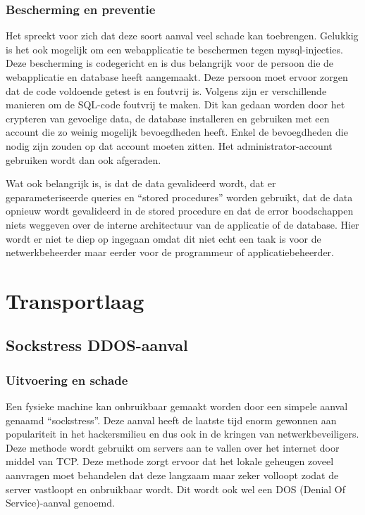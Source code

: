 \documentclass[pdftex,a4paper,12pt]{report}
\begin{document}
\subsubsection{Bescherming en preventie}
Het spreekt voor zich dat deze soort aanval veel schade kan toebrengen. Gelukkig is het ook mogelijk om een webapplicatie te beschermen tegen mysql-injecties. Deze bescherming is codegericht en is dus belangrijk voor de persoon die de webapplicatie en database heeft aangemaakt. Deze persoon moet ervoor zorgen dat de code voldoende getest is en foutvrij is. Volgens \cite{Angus2005} zijn er verschillende manieren om de SQL-code foutvrij te maken. Dit kan gedaan worden door het crypteren van gevoelige data, de database installeren en gebruiken met een account die zo weinig mogelijk bevoegdheden heeft. Enkel de bevoegdheden die nodig zijn zouden op dat account moeten zitten. Het administrator-account gebruiken wordt dan ook afgeraden. \newline

Wat ook belangrijk is, is dat de data gevalideerd wordt, dat er geparameteriseerde queries en "`stored procedures"' worden gebruikt, dat de data opnieuw wordt gevalideerd in de stored procedure en dat de error boodschappen niets weggeven over de interne architectuur van de applicatie of de database. Hier wordt er niet te diep op ingegaan omdat dit niet echt een taak is voor de netwerkbeheerder maar eerder voor de programmeur of applicatiebeheerder. 

\section{Transportlaag}
\subsection{Sockstress DDOS-aanval}
\subsubsection{Uitvoering en schade}
Een fysieke machine kan onbruikbaar gemaakt worden door een simpele aanval genaamd "`sockstress"'. Deze aanval heeft de laatste tijd enorm gewonnen aan populariteit in het hackersmilieu en dus ook in de kringen van netwerkbeveiligers. Deze methode wordt gebruikt om servers aan te vallen over het internet door middel van TCP. Deze methode zorgt ervoor dat het lokale geheugen zoveel aanvragen moet behandelen dat deze langzaam maar zeker volloopt zodat de server vastloopt en onbruikbaar wordt. Dit wordt ook wel een DOS (Denial Of Service)-aanval genoemd. \newline 
\end{document}
